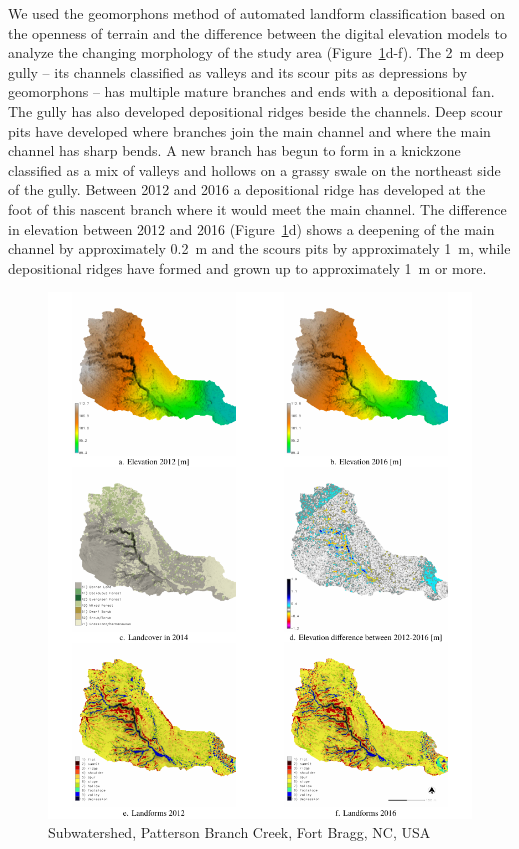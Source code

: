 \documentclass[gmd, manuscript]{copernicus}
\begin{document}
We used the geomorphons method 
of automated landform classification
based on the openness of terrain \citep{Jasiewicz2013}
and the difference between the digital elevation models 
to analyze the changing morphology of the study area
(Figure~\ref{fig:study_area}d-f). 
%
The 2~\unit{m} deep gully -- 
its channels classified as valleys and 
its scour pits as depressions by geomorphons -- 
has multiple mature branches
and ends with a depositional fan.
%
The gully has also developed 
depositional ridges beside the channels.
Deep scour pits have developed 
where branches join the main channel 
and where the main channel has sharp bends.
%
A new branch has begun to form 
in a knickzone classified as a mix of valleys and hollows
on a grassy swale on the northeast side of the gully.
Between 2012 and 2016 a depositional ridge
has developed at the foot of this nascent branch
where it would meet the main channel. 
%
The difference in elevation between 2012 and 2016
(Figure~\ref{fig:study_area}d)
shows a deepening of the main channel 
by approximately 0.2~\unit{m} 
and the scours pits
by approximately 1~\unit{m},
while depositional ridges have formed and grown up to
approximately 1~\unit{m} or more.

\begin{figure}%
\center
\includegraphics[width=\textwidth,height=0.95\textheight,keepaspectratio]{figures/study_area.pdf}
\caption{Subwatershed, Patterson Branch Creek, Fort Bragg, NC, USA}
\label{fig:study_area}
\end{figure}
\end{document}
